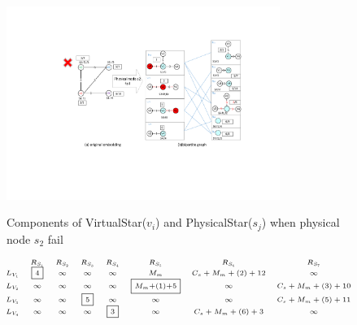 \begin{figure}
\centering
\includegraphics[width=3.5in]{Fig/StarRepresentationNode2}\\
  \caption{Components of VirtualStar($v_i$) and PhysicalStar($s_j$) when physical node $s_2$ fail}\label{fig:StarRepresentationNode2}
\end{figure}

\begin{equation*}
\tiny{
 {\begin{array}{*{20}{c}}
&R_{S_{1}}&R_{S_{2}}&R_{S_3}&R_{S_4}&R_{S_5}&R_{S_6}&R_{S_{7}}\\
{L_{V_1}}&\fbox{4}&\infty&\infty&\infty&M_{m}&C_{s}+M_{m}+(2)+12&\infty\\
L_{V_2}&\infty&\infty&\infty&\infty&\fbox{$M_{m}$+(1)+5}&\infty&C_{s}+M_{m}+(3)+10\\
L_{V_3}&\infty&\infty&\fbox{5}&\infty&\infty&\infty&C_{s}+M_{m}+(5)+11\\
L_{V_4}&\infty&\infty&\infty&\fbox{3}&\infty&C_{s}+M_{m}+(6)+3&\infty\\
\end{array}}
}
\label{lab:Node2FaliureAlignmentMatrixNew}
\end{equation*}


